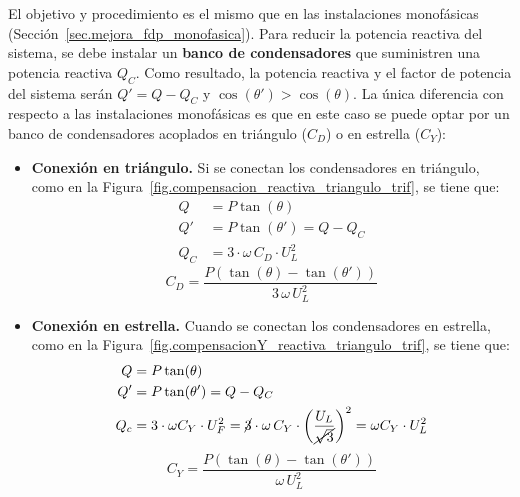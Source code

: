 \documentclass[11pt]{book} %
\begin{document}
		El objetivo y procedimiento es el mismo que en las instalaciones monofásicas (Sección~\ref{sec.mejora_fdp_monofasica}). Para reducir la potencia reactiva del sistema, se debe instalar un \textbf{banco de condensadores} que suministren una potencia reactiva $Q_C$. Como resultado, la potencia reactiva y el factor de potencia del sistema serán $Q' = Q - Q_C$ y $\cos(\theta') > \cos (\theta)$. La única diferencia con respecto a las instalaciones monofásicas es que en este caso se puede optar por un banco de condensadores acoplados en triángulo ($C_D$) o en estrella ($C_Y$):
		\begin{itemize}
		    \item \textbf{Conexión en triángulo.} Si se conectan los condensadores en triángulo, como en la Figura~\ref{fig.compensacion_reactiva_triangulo_trif}, se tiene que: 
		\begin{align*}
          Q &= P\tan(\theta)\\
          Q' &= P\tan(\theta') = Q - Q_C\\
          Q_C &= 3 \cdot \omega\, C_D \cdot U_L^2
        \end{align*}
        \begin{equation}
            \boxed{C_D = \frac{P(\tan (\theta) - \tan (\theta'))}{3\,\omega\, U_L^2}}
        \end{equation}
		    \item \textbf{Conexión en estrella.} Cuando se conectan los condensadores en estrella, como en la Figura~\ref{fig.compensacionY_reactiva_triangulo_trif}, se tiene que: 
		\begin{align*}
          Q &= P\tan(\theta)\\
          Q' &= P\tan(\theta') = Q - Q_C\\
          Q_c &= 3 \cdot \omega C_Y \cdot U_F^2 = \cancel{3} \cdot \omega \,C_Y \cdot \left(\dfrac{U_L}{\cancel{\sqrt{3}}}\right)^2=\omega C_Y \cdot U_L^2
        \end{align*}
        \begin{equation}
            \boxed{C_Y = \frac{P(\tan (\theta) - \tan (\theta'))}{\omega\, U_L^2}}
        \end{equation}
		\end{itemize}
		
\end{document}
